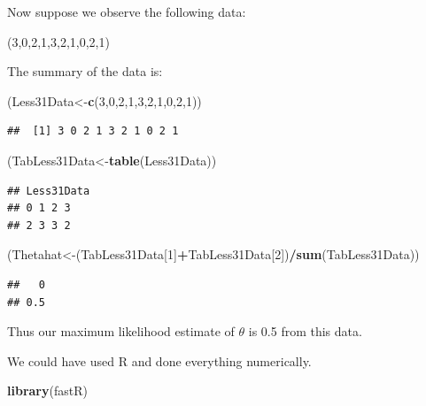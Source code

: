 \documentclass[]{book}
\newenvironment{Shaded}{\begin{snugshade}}{\end{snugshade}}
\newcommand{\KeywordTok}[1]{\textcolor[rgb]{0.13,0.29,0.53}{\textbf{#1}}}
\newcommand{\DecValTok}[1]{\textcolor[rgb]{0.00,0.00,0.81}{#1}}
\newcommand{\OperatorTok}[1]{\textcolor[rgb]{0.81,0.36,0.00}{\textbf{#1}}}
\newcommand{\NormalTok}[1]{#1}
\theoremstyle{definition}
\theoremstyle{definition}
\theoremstyle{definition}
\theoremstyle{remark}
\begin{document}
Now suppose we observe the following data:

(3,0,2,1,3,2,1,0,2,1)

The summary of the data is:

\begin{Shaded}
\begin{Highlighting}[]
\NormalTok{(Less31Data<-}\KeywordTok{c}\NormalTok{(}\DecValTok{3}\NormalTok{,}\DecValTok{0}\NormalTok{,}\DecValTok{2}\NormalTok{,}\DecValTok{1}\NormalTok{,}\DecValTok{3}\NormalTok{,}\DecValTok{2}\NormalTok{,}\DecValTok{1}\NormalTok{,}\DecValTok{0}\NormalTok{,}\DecValTok{2}\NormalTok{,}\DecValTok{1}\NormalTok{))}
\end{Highlighting}
\end{Shaded}

\begin{verbatim}
##  [1] 3 0 2 1 3 2 1 0 2 1
\end{verbatim}

\begin{Shaded}
\begin{Highlighting}[]
\NormalTok{(TabLess31Data<-}\KeywordTok{table}\NormalTok{(Less31Data))}
\end{Highlighting}
\end{Shaded}

\begin{verbatim}
## Less31Data
## 0 1 2 3 
## 2 3 3 2
\end{verbatim}

\begin{Shaded}
\begin{Highlighting}[]
\NormalTok{(Thetahat<-(TabLess31Data[}\DecValTok{1}\NormalTok{]}\OperatorTok{+}\NormalTok{TabLess31Data[}\DecValTok{2}\NormalTok{])}\OperatorTok{/}\KeywordTok{sum}\NormalTok{(TabLess31Data))}
\end{Highlighting}
\end{Shaded}

\begin{verbatim}
##   0 
## 0.5
\end{verbatim}

Thus our maximum likelihood estimate of \(\theta\) is 0.5 from this
data.

We could have used R and done everything numerically.

\begin{Shaded}
\begin{Highlighting}[]
\KeywordTok{library}\NormalTok{(fastR)}
\end{Highlighting}
\end{Shaded}
\end{document}
